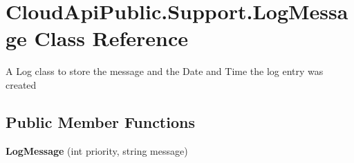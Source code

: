 \hypertarget{class_cloud_api_public_1_1_support_1_1_log_message}{\section{Cloud\-Api\-Public.\-Support.\-Log\-Message Class Reference}
\label{class_cloud_api_public_1_1_support_1_1_log_message}
}


A Log class to store the message and the Date and Time the log entry was created  


\subsection*{Public Member Functions}
\begin{DoxyCompactItemize}
\item 
\hypertarget{class_cloud_api_public_1_1_support_1_1_log_message_ab99a69a2e4ed6019388dc9d4dd7d869b}{{\bfseries Log\-Message} (int priority, string message)}\label{class_cloud_api_public_1_1_support_1_1_log_message_ab99a69a2e4ed6019388dc9d4dd7d869b}

\end{DoxyCompactItemize}
